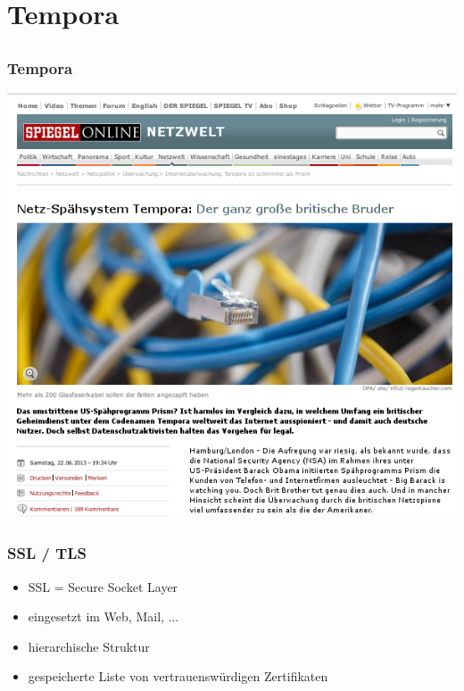 \documentclass[12pt]{beamer}
\begin{document}
\section{Tempora}
\subsection{}

\begin{frame}
    \frametitle{Tempora}
    \includegraphics[height=0.7\textheight]{img/spiegel-tempora.png}
\end{frame}


\begin{frame}
    \frametitle{SSL / TLS}
    \begin{itemize}
      \item<2-> SSL = Secure Socket Layer
      \item<3-> eingesetzt im Web, Mail, ...
      \item<4-> hierarchische Struktur
      \item<5-> gespeicherte Liste von vertrauenswürdigen Zertifikaten
    \end{itemize}
\end{frame}
\end{document}
